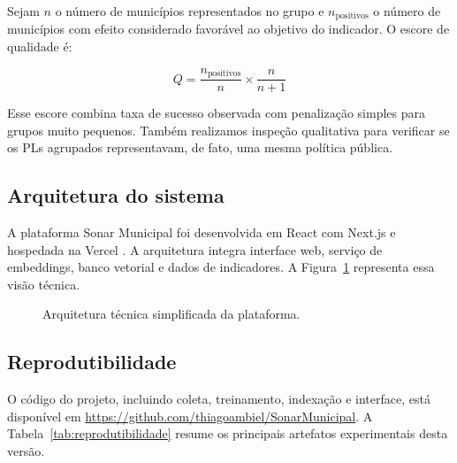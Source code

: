 Sejam $n$ o número de municípios representados no grupo e $n_{\text{positivos}}$ o número de municípios com efeito considerado favorável ao objetivo do indicador. O escore de qualidade é:

\[
Q = \frac{n_{\text{positivos}}}{n} \times \frac{n}{n+1}
\]

Esse escore combina taxa de sucesso observada com penalização simples para grupos muito pequenos. Também realizamos inspeção qualitativa para verificar se os PLs agrupados representavam, de fato, uma mesma política pública.

\subsection{Arquitetura do sistema}

A plataforma Sonar Municipal foi desenvolvida em React com Next.js e hospedada na Vercel \cite{vercel_nextjs}. A arquitetura integra interface web, serviço de embeddings, banco vetorial e dados de indicadores. A Figura~\ref{fig:arquitetura-v2} representa essa visão técnica.

\begin{figure}[H]
\centering
{}%
\caption{Arquitetura técnica simplificada da plataforma.}
\label{fig:arquitetura-v2}
\end{figure}

\subsection{Reprodutibilidade}

O código do projeto, incluindo coleta, treinamento, indexação e interface, está disponível em \url{https://github.com/thiagoambiel/SonarMunicipal}. A Tabela~\ref{tab:reprodutibilidade} resume os principais artefatos experimentais desta versão.

